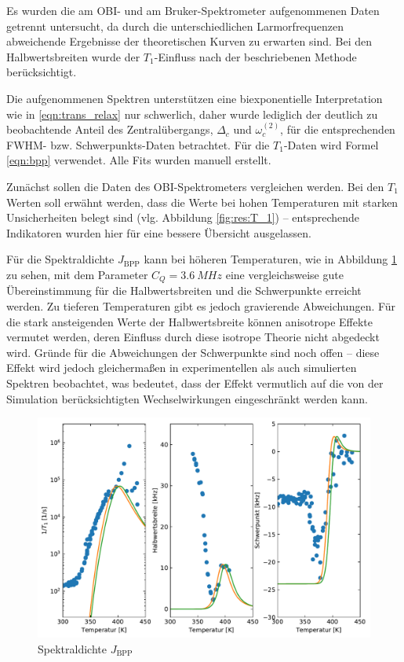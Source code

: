 Es wurden die am OBI- und am Bruker-Spektrometer aufgenommenen Daten getrennt untersucht, da durch die unterschiedlichen Larmorfrequenzen abweichende Ergebnisse der theoretischen Kurven zu erwarten sind. Bei den Halbwertsbreiten wurde der $T_1$-Einfluss nach der beschriebenen Methode berücksichtigt.



Die aufgenommenen Spektren unterstützen eine biexponentielle Interpretation wie in \eqref{eqn:trans_relax} nur schwerlich, daher wurde lediglich der deutlich zu beobachtende Anteil des Zentralübergangs, $\Delta_c$ und $\omega_c^{(2)}$, für die entsprechenden FWHM- bzw. Schwerpunkts-Daten betrachtet. Für die $T_1$-Daten wird Formel \eqref{eqn:bpp} verwendet. Alle Fits wurden manuell erstellt.



Zunächst sollen die Daten des OBI-Spektrometers vergleichen werden. Bei den $T_1$ Werten soll erwähnt werden, dass die Werte bei hohen Temperaturen mit starken Unsicherheiten belegt sind (vlg. Abbildung \ref{fig:res:T_1}) -- entsprechende Indikatoren wurden hier für eine bessere Übersicht ausgelassen.

Für die Spektraldichte $J_\text{BPP}$ kann bei höheren Temperaturen, wie in Abbildung \ref{fig:res:theorie_j} zu sehen, mit dem Parameter $C_Q = \SI{3.6}{MHz}$ eine vergleichsweise gute Übereinstimmung für die Halbwertsbreiten und die Schwerpunkte erreicht werden. Zu tieferen Temperaturen gibt es jedoch gravierende Abweichungen. Für die stark ansteigenden Werte der Halbwertsbreite können anisotrope Effekte vermutet werden, deren Einfluss durch diese isotrope Theorie nicht abgedeckt wird. Gründe für die Abweichungen der Schwerpunkte sind noch offen -- diese Effekt wird jedoch gleichermaßen in experimentellen als auch simulierten Spektren beobachtet, was bedeutet, dass der Effekt vermutlich auf die von der Simulation berücksichtigten Wechselwirkungen eingeschränkt werden kann.
\begin{figure}
	\begin{center}
		\includegraphics[width=\textwidth]{graphics/plot/OBI_J_02.pdf}
	\end{center}
	\caption{Spektraldichte $J_\text{BPP}$} \label{fig:res:theorie_j}
\end{figure}

